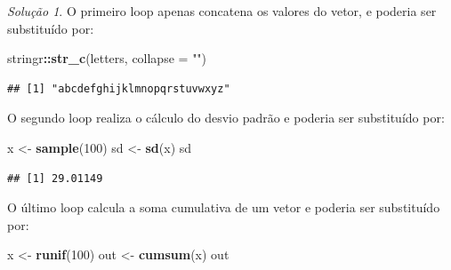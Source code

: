 \documentclass[
]{latex/krantz}
\newenvironment{Shaded}{\begin{snugshade}}{\end{snugshade}}
\newcommand{\AttributeTok}[1]{\textcolor[rgb]{0.13,0.29,0.53}{#1}}
\newcommand{\DecValTok}[1]{\textcolor[rgb]{0.00,0.00,0.81}{#1}}
\newcommand{\FunctionTok}[1]{\textcolor[rgb]{0.13,0.29,0.53}{\textbf{#1}}}
\newcommand{\NormalTok}[1]{#1}
\newcommand{\OtherTok}[1]{\textcolor[rgb]{0.56,0.35,0.01}{#1}}
\newcommand{\SpecialCharTok}[1]{\textcolor[rgb]{0.81,0.36,0.00}{\textbf{#1}}}
\newcommand{\StringTok}[1]{\textcolor[rgb]{0.31,0.60,0.02}{#1}}
\theoremstyle{definition}
\theoremstyle{definition}
\theoremstyle{definition}
\theoremstyle{definition}
\theoremstyle{remark}
\newtheorem*{solution}{Solução}
\begin{document}
\begin{solution}

O primeiro loop apenas concatena os valores do vetor, e poderia ser substituído por:

\begin{Shaded}
\begin{Highlighting}[]
\NormalTok{stringr}\SpecialCharTok{::}\FunctionTok{str\_c}\NormalTok{(letters, }\AttributeTok{collapse =} \StringTok{""}\NormalTok{)}
\end{Highlighting}
\end{Shaded}

\begin{verbatim}
## [1] "abcdefghijklmnopqrstuvwxyz"
\end{verbatim}

O segundo loop realiza o cálculo do desvio padrão e poderia ser substituído por:

\begin{Shaded}
\begin{Highlighting}[]
\NormalTok{x }\OtherTok{\textless{}{-}} \FunctionTok{sample}\NormalTok{(}\DecValTok{100}\NormalTok{)}
\NormalTok{sd }\OtherTok{\textless{}{-}} \FunctionTok{sd}\NormalTok{(x)}
\NormalTok{sd}
\end{Highlighting}
\end{Shaded}

\begin{verbatim}
## [1] 29.01149
\end{verbatim}

O último loop calcula a soma cumulativa de um vetor e poderia ser substituído por:

\begin{Shaded}
\begin{Highlighting}[]
\NormalTok{x }\OtherTok{\textless{}{-}} \FunctionTok{runif}\NormalTok{(}\DecValTok{100}\NormalTok{)}
\NormalTok{out }\OtherTok{\textless{}{-}} \FunctionTok{cumsum}\NormalTok{(x)}
\NormalTok{out}
\end{Highlighting}
\end{Shaded}


\end{solution}
\end{document}
